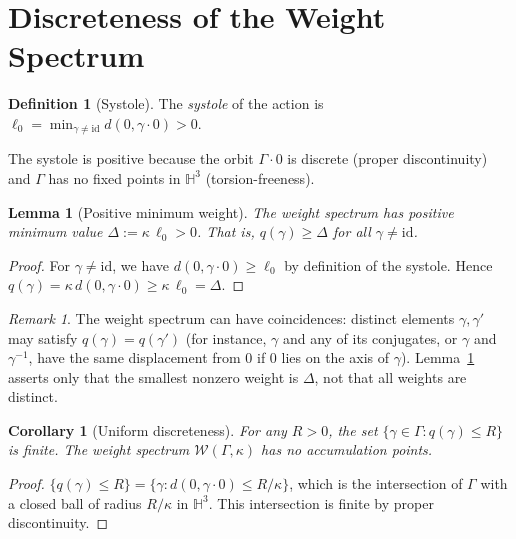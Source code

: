 \documentclass[12pt]{article}
\newtheorem{lemma}[theorem]{Lemma}
\newtheorem{corollary}[theorem]{Corollary}
\theoremstyle{definition}
\newtheorem{definition}[theorem]{Definition}
\theoremstyle{remark}
\newtheorem{remark}[theorem]{Remark}
\begin{document}
\section{Discreteness of the Weight Spectrum}
\label{sec:gap}

\begin{definition}[Systole]
The \emph{systole} of the action is
$\ell_0=\min_{\gamma\neq\mathrm{id}}d(0,\gamma\cdot0)>0$.
\end{definition}

The systole is positive because the orbit $\Gamma\cdot0$ is discrete
(proper discontinuity) and $\Gamma$ has no fixed points in $\mathbb{H}^3$
(torsion-freeness).

\begin{lemma}[Positive minimum weight]\label{lem:gap}
The weight spectrum has positive minimum value
$\Delta:=\kappa\,\ell_0>0$.
That is, $q(\gamma)\ge\Delta$ for all $\gamma\neq\mathrm{id}$.
\end{lemma}

\begin{proof}
For $\gamma\neq\mathrm{id}$, we have $d(0,\gamma\cdot0)\ge\ell_0$ by
definition of the systole. Hence $q(\gamma)=\kappa\,d(0,\gamma\cdot0)
\ge\kappa\,\ell_0=\Delta$.
\end{proof}

\begin{remark}
The weight spectrum can have coincidences: distinct elements $\gamma,\gamma'$
may satisfy $q(\gamma)=q(\gamma')$ (for instance, $\gamma$ and any of its
conjugates, or $\gamma$ and $\gamma^{-1}$, have the same displacement from
$0$ if $0$ lies on the axis of $\gamma$). Lemma~\ref{lem:gap} asserts only
that the smallest nonzero weight is $\Delta$, not that all weights are
distinct.
\end{remark}

\begin{corollary}[Uniform discreteness]\label{cor:discrete}
For any $R>0$, the set $\{\gamma\in\Gamma:q(\gamma)\le R\}$ is finite.
The weight spectrum $\mathcal{W}(\Gamma,\kappa)$ has no accumulation points.
\end{corollary}

\begin{proof}
$\{q(\gamma)\le R\}=\{\gamma:d(0,\gamma\cdot0)\le R/\kappa\}$, which is
the intersection of $\Gamma$ with a closed ball of radius $R/\kappa$
in $\mathbb{H}^3$. This intersection is finite by proper discontinuity.
\end{proof}
\end{document}
